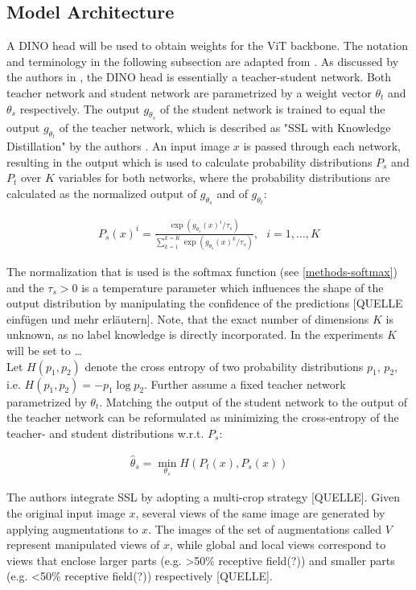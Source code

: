 \subsection{Model Architecture}
A DINO head will be used to obtain weights for the ViT backbone.
The notation and terminology in the following subsection are adapted from \citep{Caron2021}.
As discussed by the authors in \citep{Caron2021}, the DINO head is essentially a teacher-student network.
Both teacher network and student network are parametrized by a weight vector $\theta_t$ and $\theta_s$ respectively.
The output $g_{\theta_s}$ of the student network is trained to equal the output $g_{\theta_t}$ of the teacher network, which is described as "SSL with Knowledge Distillation" by the authors \citep{Caron2021}.
An input image $x$ is passed through each network, resulting in the output which is used to calculate probability distributions $P_s$ and $P_t$ over $K$ variables for both networks, where the probability distributions are calculated as the normalized output of $g_{\theta_s}$ and of $g_{\theta_t}$:

\begin{align}
	P_s(x)^i = \frac{\exp(g_{\theta_s}(x)^i/\tau_s)}{\sum_{k=1}^{k=K}\exp(g_{\theta_s}(x)^k/\tau_s)}, \hspace{8pt} i=1,\dots,K
	\label{methods-softmax}
\end{align}

The normalization that is used is the softmax function (see \ref{methods-softmax}) and the $\tau_s > 0$ is a temperature parameter which influences the shape of the output distribution by manipulating the confidence of the predictions [QUELLE einfügen und mehr erläutern].
Note, that the exact number of dimensions $K$ is unknown, as no label knowledge is directly incorporated.
In the experiments $K$ will be set to \dots
\\
Let $H(p_1,p_2)$ denote the cross entropy of two probability distributions $p_1$, $p_2$, i.e. $H(p_1,p_2)=-p_1 \log p_2$.
Further assume a fixed teacher network parametrized by $\theta_t$.
Matching the output of the student network to the output of the teacher network can be reformulated as minimizing the cross-entropy of the teacher- and student distributions w.r.t. $P_s$:

\begin{align}
	\hat{\theta}_s = \min_{\theta_s}H(P_t(x),P_s(x))
\end{align}

The authors integrate SSL by adopting a multi-crop strategy [QUELLE].
Given the original input image $x$, several views of the same image are generated by applying augmentations to $x$.
The images of the set of augmentations called $V$ represent manipulated views of $x$, while global and local views correspond to views that enclose larger parts (e.g. >50\% receptive field(?)) and smaller parts (e.g. <50\% receptive field(?)) respectively [QUELLE].

